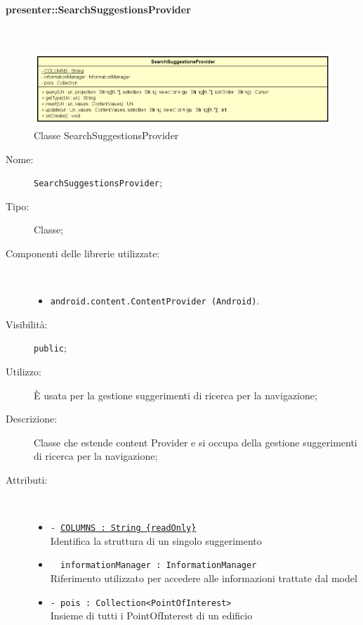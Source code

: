 \documentclass[../DefinizioneDiProdotto.tex]{subfiles}
\begin{document}
\paragraph{presenter::SearchSuggestionsProvider}
\
\begin{figure}[H]
	\centering
	\includegraphics[width=\maxwidth]{img/SearchSuggestionsProvider.png}
	\caption{Classe SearchSuggestionsProvider}\label{fig:presenter::SearchSuggestionsProvider} 
\end{figure}
\begin{description}
	\item[Nome:] \texttt{SearchSuggestionsProvider};
	\item[Tipo:] Classe;
	\item[Componenti delle librerie utilizzate:] \
	\begin{itemize}
		\item \texttt{android.content.ContentProvider (Android)}.
		
	\end{itemize}
	\item[Visibilità:] \texttt{public};
	\item[Utilizzo:] È usata per la gestione suggerimenti di ricerca per la navigazione;
	\item[Descrizione:] Classe che estende content Provider e si occupa della gestione suggerimenti di ricerca per la navigazione;
	\item[Attributi:] \
	\begin{itemize}
		\item \texttt{- \underline{COLUMNS : String \{readOnly\}}}\\
		Identifica la struttura di un singolo suggerimento
		
		\item \texttt{~ informationManager : InformationManager}\\
		Riferimento utilizzato per accedere alle informazioni trattate dal model
		
		\item \texttt{- pois : Collection<PointOfInterest>}\\
		Insieme di tutti i PointOfInterest di un edificio
		

\end{itemize}
\end{description}
\end{document}
